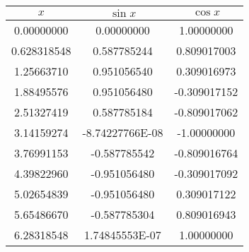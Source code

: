  \begin{tabular}{|c|c|c|} \hline
 $x$ & $\sin x$ & $\cos x$ \\ \hline
   0.00000000     &   0.00000000     &   1.00000000     \\
  0.628318548     &  0.587785244     &  0.809017003     \\
   1.25663710     &  0.951056540     &  0.309016973     \\
   1.88495576     &  0.951056480     & -0.309017152     \\
   2.51327419     &  0.587785184     & -0.809017062     \\
   3.14159274     &  -8.74227766E-08 &  -1.00000000     \\
   3.76991153     & -0.587785542     & -0.809016764     \\
   4.39822960     & -0.951056480     & -0.309017092     \\
   5.02654839     & -0.951056480     &  0.309017122     \\
   5.65486670     & -0.587785304     &  0.809016943     \\
   6.28318548     &   1.74845553E-07 &   1.00000000     \\
 \hline \end{tabular}
